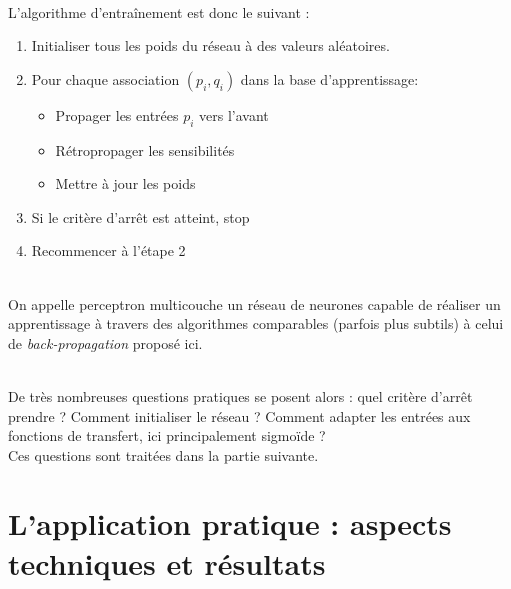 \documentclass[a4paper, 11pt]{article}
\begin{document}
\\ L'algorithme d'entraînement est donc le suivant : 

\begin{enumerate}

\item Initialiser tous les poids du réseau à des valeurs aléatoires.
\item Pour chaque association $(p_i,q_i)$ dans la base d’apprentissage:
\begin{itemize}
	\item Propager les entrées $p_i$ vers l'avant
	\item Rétropropager les sensibilités
	\item Mettre à jour les poids
\end{itemize}
\item Si le critère d'arrêt est atteint, stop
\item Recommencer à l'étape 2
\end{enumerate}


\\On appelle perceptron multicouche un réseau de neurones capable de réaliser un apprentissage à travers des algorithmes comparables (parfois plus subtils) à celui de \emph{back-propagation} proposé ici.

\\De très nombreuses questions pratiques se posent alors : quel critère d'arrêt prendre ? Comment initialiser le réseau ? Comment adapter les entrées aux fonctions de transfert, ici principalement sigmoïde ?
\\Ces questions sont traitées dans la partie suivante.

\section{L'application pratique : aspects techniques et résultats}

 
\end{document}
